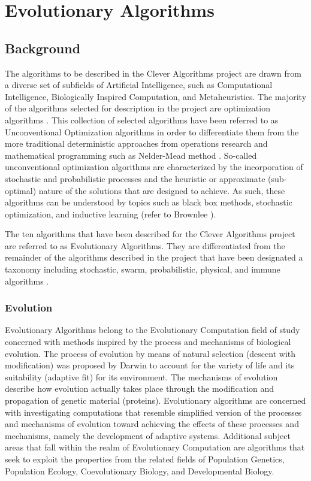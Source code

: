 \documentclass[a4paper, 11pt]{article}
\begin{document}
% 
% 
\section{Evolutionary Algorithms}
\label{sec:algorithms}

% 
% 
\subsection{Background}
The algorithms to be described in the Clever Algorithms project are drawn from a diverse set of subfields of Artificial Intelligence, such as Computational Intelligence, Biologically Inspired Computation, and Metaheuristics. The majority of the algorithms selected for description in the project are optimization algorithms \cite{Brownlee2010b}. 
This collection of selected algorithms have been referred to as Unconventional Optimization algorithms in order to differentiate them from the more traditional deterministic approaches from operations research and mathematical programming such as Nelder-Mead method \cite{Brownlee2010n}. So-called unconventional optimization algorithms are characterized by the incorporation of stochastic and probabilistic processes and the heuristic or approximate (sub-optimal) nature of the solutions that are designed to achieve. As such, these algorithms can be understood by topics such as black box methods, stochastic optimization, and inductive learning (refer to Brownlee \cite{Brownlee2010n}). 

The ten algorithms that have been described for the Clever Algorithms project are referred to as Evolutionary Algorithms. They are differentiated from the remainder of the algorithms described in the project that have been designated a taxonomy including stochastic, swarm, probabilistic, physical, and immune algorithms \cite{Brownlee2010b}. 

\subsubsection{Evolution}
Evolutionary Algorithms belong to the Evolutionary Computation field of study concerned with methods inspired by the process and mechanisms of biological evolution. The process of evolution by means of natural selection (descent with modification) was proposed by Darwin to account for the variety of life and its suitability (adaptive fit) for its environment. The mechanisms of evolution describe how evolution actually takes place through the modification and propagation of genetic material (proteins). Evolutionary algorithms are concerned with investigating computations that resemble simplified version of the processes and mechanisms of evolution toward achieving the effects of these processes and mechanisms, namely the development of adaptive systems.
Additional subject areas that fall within the realm of Evolutionary Computation are algorithms that seek to exploit the properties from the related fields of Population Genetics, Population Ecology, Coevolutionary Biology, and Developmental Biology. 
\end{document}

